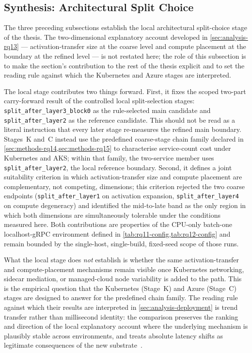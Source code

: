 \subsection{Synthesis: Architectural Split Choice}
\label{sec:analysis-split-synthesis}

The three preceding subsections establish the local architectural
split-choice stage of the thesis. The two-dimensional explanatory
account developed in \cref{sec:analysis-rq13} --- activation-transfer
size at the coarse level and compute placement at the boundary at the
refined level --- is not restated here; the role of this subsection is
to make the section's contribution to the rest of the thesis explicit
and to set the reading rule against which the Kubernetes and Azure
stages are interpreted.

The local stage contributes two things forward. First, it fixes the
scoped two-part carry-forward result of the controlled local
split-selection stages: \texttt{split\_after\_layer3\_block0} as the
rule-selected main candidate and \texttt{split\_after\_layer2} as the
reference candidate. This should not be read as a literal instruction
that every later stage re-measures the refined main boundary. Stages~K
and~C instead use the predefined coarse-stage chain family declared in
\cref{sec:methods-rq14,sec:methods-rq15} to characterise service-count
cost under Kubernetes and AKS; within that family, the two-service member
uses \texttt{split\_after\_layer2}, the local reference boundary. Second,
it defines a joint suitability criterion in which activation-transfer size and
compute placement are complementary, not competing, dimensions; this
criterion rejected the two coarse endpoints
(\texttt{split\_after\_layer1} on activation expansion,
\texttt{split\_after\_layer4} on compute degeneracy) and identified the
mid-to-late band as the only region in which both dimensions are
simultaneously tolerable under the conditions measured here. Both
contributions are properties of the CPU-only batch-one localhost-gRPC
environment defined in
\cref{tab:rq11-config,tab:rq12-config} and remain bounded by the
single-host, single-build, fixed-seed scope of those runs.

What the local stage does \emph{not} establish is whether the same
activation-transfer and compute-placement mechanisms remain visible once
Kubernetes networking, sidecar mediation, or managed-cloud node
variability is added to the path. This is the empirical question that the
Kubernetes (Stage~K) and Azure (Stage~C) stages are designed to answer for
the predefined chain family. The reading rule against which their results
are interpreted in
\cref{sec:analysis-deployment} is trend transfer rather than
millisecond identity: the comparison preserves the ranking and
direction of the local explanatory account where the underlying
mechanism is plausibly stable across environments, and treats absolute
latency shifts as legitimate consequences of the new
substrate~\cite{benchmarking_sc15,noise_in_clouds}.
